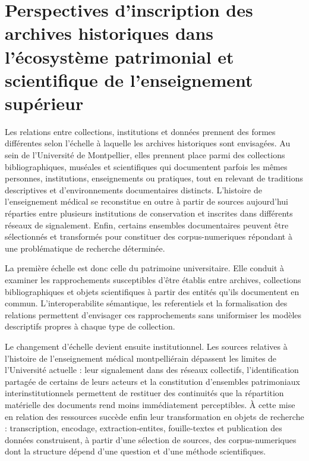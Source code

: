\part{Perspectives d'inscription des archives historiques dans l'écosystème patrimonial et scientifique de l'enseignement supérieur}
\label{part:ecosysteme-patrimonial}

Les relations entre collections, institutions et données prennent des formes différentes selon l'échelle à laquelle les archives historiques sont envisagées. Au sein de l'Université de Montpellier, elles prennent place parmi des collections bibliographiques, muséales et scientifiques qui documentent parfois les mêmes personnes, institutions, enseignements ou pratiques, tout en relevant de traditions descriptives et d'environnements documentaires distincts. L'histoire de l'enseignement médical se reconstitue en outre à partir de sources aujourd'hui réparties entre plusieurs institutions de conservation et inscrites dans différents réseaux de \gls{signalement}. Enfin, certains ensembles documentaires peuvent être sélectionnés et transformés pour constituer des \glspl{corpus-numerique} répondant à une problématique de recherche déterminée.

La première échelle est donc celle du patrimoine universitaire. Elle conduit à examiner les rapprochements susceptibles d'être établis entre archives, collections bibliographiques et objets scientifiques à partir des entités qu'ils documentent en commun. L'\gls{interoperabilite} sémantique, les \glspl{referentiel} et la formalisation des relations permettent d'envisager ces rapprochements sans uniformiser les modèles descriptifs propres à chaque type de collection.

Le changement d'échelle devient ensuite institutionnel. Les sources relatives à l'histoire de l'enseignement médical montpelliérain dépassent les limites de l'Université actuelle : leur \gls{signalement} dans des réseaux collectifs, l'identification partagée de certains de leurs acteurs et la constitution d'ensembles patrimoniaux interinstitutionnels permettent de restituer des continuités que la répartition matérielle des documents rend moins immédiatement perceptibles. À cette mise en relation des ressources succède enfin leur transformation en objets de recherche : transcription, encodage, \gls{extraction-entites}, \gls{fouille-textes} et publication des données construisent, à partir d'une sélection de sources, des \glspl{corpus-numerique} dont la structure dépend d'une question et d'une méthode scientifiques.

